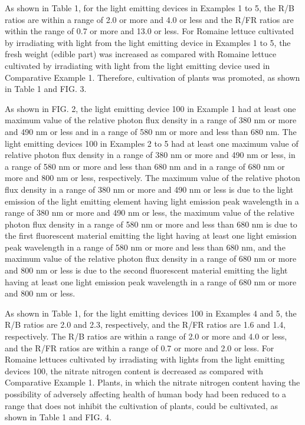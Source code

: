 \documentclass[11pt,a4paper]{article}
\begin{document}
As shown in Table 1, for the light emitting devices in Examples 1 to 5, the R/B ratios are within a range of 2.0 or more and 4.0 or less and the R/FR ratios are within the range of 0.7 or more and 13.0 or less. For Romaine lettuce cultivated by irradiating with light from the light emitting device in Examples 1 to 5, the fresh weight (edible part) was increased as compared with Romaine lettuce cultivated by irradiating with light from the light emitting device used in Comparative Example 1. Therefore, cultivation of plants was promoted, as shown in Table 1 and FIG. 3.

As shown in FIG. 2, the light emitting device 100 in Example 1 had at least one maximum value of the relative photon flux density in a range of 380 nm or more and 490 nm or less and in a range of 580 nm or more and less than 680 nm. The light emitting devices 100 in Examples 2 to 5 had at least one maximum value of relative photon flux density in a range of 380 nm or more and 490 nm or less, in a range of 580 nm or more and less than 680 nm and in a range of 680 nm or more and 800 nm or less, respectively. The maximum value of the relative photon flux density in a range of 380 nm or more and 490 nm or less is due to the light emission of the light emitting element having light emission peak wavelength in a range of 380 nm or more and 490 nm or less, the maximum value of the relative photon flux density in a range of 580 nm or more and less than 680 nm is due to the first fluorescent material emitting the light having at least one light emission peak wavelength in a range of 580 nm or more and less than 680 nm, and the maximum value of the relative photon flux density in a range of 680 nm or more and 800 nm or less is due to the second fluorescent material emitting the light having at least one light emission peak wavelength in a range of 680 nm or more and 800 nm or less.

As shown in Table 1, for the light emitting devices 100 in Examples 4 and 5, the R/B ratios are 2.0 and 2.3, respectively, and the R/FR ratios are 1.6 and 1.4, respectively. The R/B ratios are within a range of 2.0 or more and 4.0 or less, and the R/FR ratios are within a range of 0.7 or more and 2.0 or less. For Romaine lettuces cultivated by irradiating with lights from the light emitting devices 100, the nitrate nitrogen content is decreased as compared with Comparative Example 1. Plants, in which the nitrate nitrogen content having the possibility of adversely affecting health of human body had been reduced to a range that does not inhibit the cultivation of plants, could be cultivated, as shown in Table 1 and FIG. 4.
\end{document}
